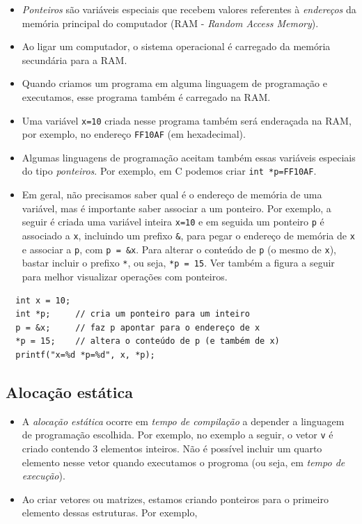 \documentclass[12pt,a4paper]{article}
\providecommand{\tightlist}{%
      \setlength{\itemsep}{0pt}\setlength{\parskip}{0pt}}
\begin{document}
    \begin{itemize}
\item
  \emph{Ponteiros} são variáveis especiais que recebem valores
  referentes à \emph{endereços} da memória principal do computador (RAM
  - \emph{Random Access Memory}).
\item
  Ao ligar um computador, o sistema operacional é carregado da memória
  secundária para a RAM.
\item
  Quando criamos um programa em alguma linguagem de programação e
  executamos, esse programa também é carregado na RAM.
\item
  Uma variável \texttt{x=10} criada nesse programa também será
  enderaçada na RAM, por exemplo, no endereço \texttt{FF10AF} (em
  hexadecimal).
\item
  Algumas linguagens de programação aceitam também essas variáveis
  especiais do tipo \emph{ponteiros}. Por exemplo, em C podemos criar
  \texttt{int\ *p=FF10AF}.
\item
  Em geral, não precisamos saber qual é o endereço de memória de uma
  variável, mas é importante saber associar a um ponteiro. Por exemplo,
  a seguir é criada uma variável inteira \texttt{x=10} e em seguida um
  ponteiro \texttt{p} é associado a \texttt{x}, incluindo um prefixo
  \texttt{\&}, para pegar o endereço de memória de \texttt{x} e associar
  a \texttt{p}, com \texttt{p\ =\ \&x}. Para alterar o conteúdo de
  \texttt{p} (o mesmo de \texttt{x}), bastar incluir o prefixo
  \texttt{*}, ou seja, \texttt{*p\ =\ 15}. Ver também a figura a seguir
  para melhor visualizar operações com ponteiros.
\end{itemize}

\begin{verbatim}
  int x = 10;
  int *p;     // cria um ponteiro para um inteiro
  p = &x;     // faz p apontar para o endereço de x
  *p = 15;    // altera o conteúdo de p (e também de x)
  printf("x=%d *p=%d", x, *p);
\end{verbatim}

    \hypertarget{alocauxe7uxe3o-estuxe1tica}{%
\subsection{Alocação estática}\label{alocauxe7uxe3o-estuxe1tica}}

    \begin{itemize}
\tightlist
\item
  A \emph{alocação estática} ocorre em \emph{tempo de compilação} a
  depender a linguagem de programação escolhida. Por exemplo, no exemplo
  a seguir, o vetor \texttt{v} é criado contendo 3 elementos inteiros.
  Não é possível incluir um quarto elemento nesse vetor quando
  executamos o progroma (ou seja, em \emph{tempo de execução}).
\item
  Ao criar vetores ou matrizes, estamos criando ponteiros para o
  primeiro elemento dessas estruturas. Por exemplo,
\end{itemize}
\end{document}
